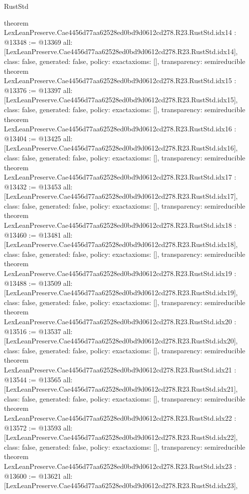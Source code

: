 \begin{lexlean}{RustStd}
\begin{coremodule}
{}
theorem LexLeanPreserve.Cae4456d77aa62528ed0bd9d0612cd278.R23.RustStd.idx14 : @13348 := @13369 {
  all: [LexLeanPreserve.Cae4456d77aa62528ed0bd9d0612cd278.R23.RustStd.idx14],
  class: false,
  generated: false,
  policy: exact{axioms: []},
  transparency: semireducible
}
theorem LexLeanPreserve.Cae4456d77aa62528ed0bd9d0612cd278.R23.RustStd.idx15 : @13376 := @13397 {
  all: [LexLeanPreserve.Cae4456d77aa62528ed0bd9d0612cd278.R23.RustStd.idx15],
  class: false,
  generated: false,
  policy: exact{axioms: []},
  transparency: semireducible
}
theorem LexLeanPreserve.Cae4456d77aa62528ed0bd9d0612cd278.R23.RustStd.idx16 : @13404 := @13425 {
  all: [LexLeanPreserve.Cae4456d77aa62528ed0bd9d0612cd278.R23.RustStd.idx16],
  class: false,
  generated: false,
  policy: exact{axioms: []},
  transparency: semireducible
}
theorem LexLeanPreserve.Cae4456d77aa62528ed0bd9d0612cd278.R23.RustStd.idx17 : @13432 := @13453 {
  all: [LexLeanPreserve.Cae4456d77aa62528ed0bd9d0612cd278.R23.RustStd.idx17],
  class: false,
  generated: false,
  policy: exact{axioms: []},
  transparency: semireducible
}
theorem LexLeanPreserve.Cae4456d77aa62528ed0bd9d0612cd278.R23.RustStd.idx18 : @13460 := @13481 {
  all: [LexLeanPreserve.Cae4456d77aa62528ed0bd9d0612cd278.R23.RustStd.idx18],
  class: false,
  generated: false,
  policy: exact{axioms: []},
  transparency: semireducible
}
theorem LexLeanPreserve.Cae4456d77aa62528ed0bd9d0612cd278.R23.RustStd.idx19 : @13488 := @13509 {
  all: [LexLeanPreserve.Cae4456d77aa62528ed0bd9d0612cd278.R23.RustStd.idx19],
  class: false,
  generated: false,
  policy: exact{axioms: []},
  transparency: semireducible
}
theorem LexLeanPreserve.Cae4456d77aa62528ed0bd9d0612cd278.R23.RustStd.idx20 : @13516 := @13537 {
  all: [LexLeanPreserve.Cae4456d77aa62528ed0bd9d0612cd278.R23.RustStd.idx20],
  class: false,
  generated: false,
  policy: exact{axioms: []},
  transparency: semireducible
}
theorem LexLeanPreserve.Cae4456d77aa62528ed0bd9d0612cd278.R23.RustStd.idx21 : @13544 := @13565 {
  all: [LexLeanPreserve.Cae4456d77aa62528ed0bd9d0612cd278.R23.RustStd.idx21],
  class: false,
  generated: false,
  policy: exact{axioms: []},
  transparency: semireducible
}
theorem LexLeanPreserve.Cae4456d77aa62528ed0bd9d0612cd278.R23.RustStd.idx22 : @13572 := @13593 {
  all: [LexLeanPreserve.Cae4456d77aa62528ed0bd9d0612cd278.R23.RustStd.idx22],
  class: false,
  generated: false,
  policy: exact{axioms: []},
  transparency: semireducible
}
theorem LexLeanPreserve.Cae4456d77aa62528ed0bd9d0612cd278.R23.RustStd.idx23 : @13600 := @13621 {
  all: [LexLeanPreserve.Cae4456d77aa62528ed0bd9d0612cd278.R23.RustStd.idx23],
}
\end{coremodule}
\end{lexlean}

